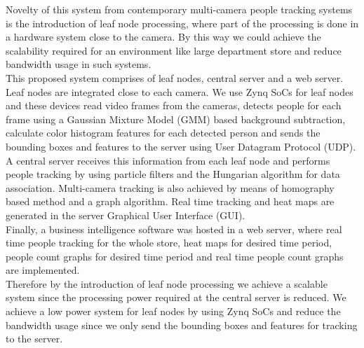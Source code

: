 \documentclass[12pt,a4paper]{report}
\begin{document}
Novelty of this system from contemporary multi-camera people tracking systems is the introduction of leaf node processing, where part of the processing is done in a hardware system close to the camera. By this way we could achieve the scalability required for an environment like large department store and reduce bandwidth usage in such systems.\\
This proposed system comprises of leaf nodes, central server and a web server. Leaf nodes are integrated close to each camera. We use Zynq SoCs for leaf nodes and these devices read video frames from the cameras, detects people for each frame using a Gaussian Mixture Model (GMM) based background subtraction, calculate color histogram features for each detected person and sends the bounding boxes and features to the server using User Datagram Protocol (UDP).\\
A central server receives this information from each leaf node and performs people tracking by using particle filters and the Hungarian algorithm for data association. Multi-camera tracking is also achieved by means of homography based method and a graph algorithm. Real time tracking and heat maps are generated in the server Graphical User Interface (GUI).\\
Finally, a business intelligence software was hosted in a web server, where real time people tracking for the whole store, heat maps for desired time period, people count graphs for desired time period and real time people count graphs are implemented.\\
Therefore by the introduction of leaf node processing we achieve a scalable system since the processing power required at the central server is reduced. We achieve a low power system for leaf nodes by using Zynq SoCs and reduce the bandwidth usage since we only send the bounding boxes and features for tracking to the server.
\end{document}
